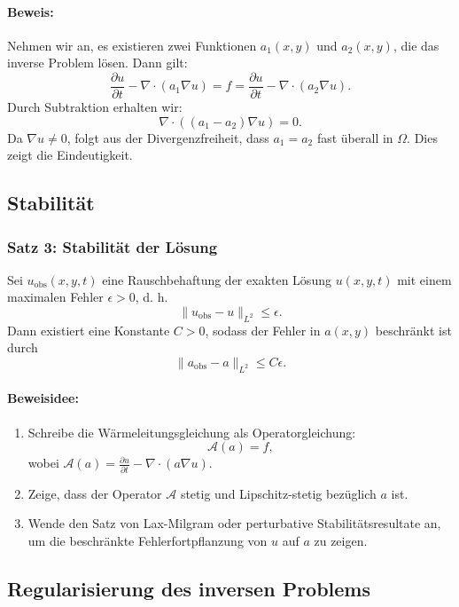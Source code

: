 \paragraph{Beweis:} Nehmen wir an, es existieren zwei Funktionen $a_1(x,y)$ und $a_2(x,y)$, die das inverse Problem lösen. Dann gilt:
\[
\frac{\partial u}{\partial t} - \nabla \cdot (a_1 \nabla u) = f = \frac{\partial u}{\partial t} - \nabla \cdot (a_2 \nabla u).
\]
Durch Subtraktion erhalten wir:
\[
\nabla \cdot \left( (a_1 - a_2) \nabla u \right) = 0.
\]
Da $\nabla u \neq 0$, folgt aus der Divergenzfreiheit, dass $a_1 = a_2$ fast überall in $\Omega$. Dies zeigt die Eindeutigkeit.

\subsection{Stabilität}

\subsubsection{Satz 3: Stabilität der Lösung}

Sei $u_{\text{obs}}(x,y,t)$ eine Rauschbehaftung der exakten Lösung $u(x,y,t)$ mit einem maximalen Fehler $\epsilon > 0$, d. h.
\[
\| u_{\text{obs}} - u \|_{L^2} \leq \epsilon.
\]
Dann existiert eine Konstante $C > 0$, sodass der Fehler in $a(x,y)$ beschränkt ist durch
\[
\| a_{\text{obs}} - a \|_{L^2} \leq C \epsilon.
\]

\paragraph{Beweisidee:}
\begin{enumerate}
	\item Schreibe die Wärmeleitungsgleichung als Operatorgleichung:
	\[
	\mathcal{A}(a) = f,
	\]
	wobei $\mathcal{A}(a) = \frac{\partial u}{\partial t} - \nabla \cdot (a \nabla u)$.
	\item Zeige, dass der Operator $\mathcal{A}$ stetig und Lipschitz-stetig bezüglich $a$ ist.
	\item Wende den Satz von Lax-Milgram oder perturbative Stabilitätsresultate an, um die beschränkte Fehlerfortpflanzung von $u$ auf $a$ zu zeigen.
\end{enumerate}

\subsection{Regularisierung des inversen Problems}

